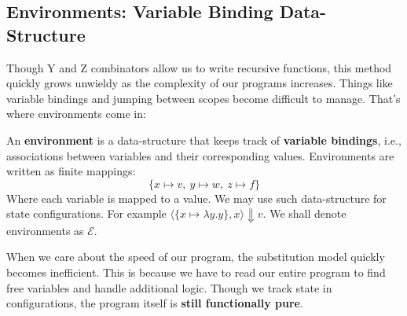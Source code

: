 \subsection{Environments: Variable Binding Data-Structure}
\noindent
Though Y and Z combinators allow us to write recursive functions, this method quickly grows unwieldy as the complexity of our programs increases.
Things like variable bindings and jumping between scopes become difficult to manage. That's where environments come in:
\begin{Def}[Environment]

    \label{def:environment}

    \noindent
    An \textbf{environment} is a data-structure that keeps track of \textbf{variable bindings}, i.e., associations between variables and their corresponding values. Environments are written as finite mappings:
    \LARGE
    \[
        \{ x \mapsto v,\ y \mapsto w,\ z \mapsto f \}
    \]
    \normalsize
    Where each variable is mapped to a value. We may use such data-structure for state configurations. For example $\langle\{x\mapsto \lambda y.y\}, x  \rangle \Downarrow v$. We shall denote environments as $\mathcal{E}$.
\end{Def}
\noindent

\begin{theo}

    When we care about the speed of our program, the substitution model quickly becomes inefficient.
    This is because we have to read our entire program to find free variables and handle additional logic.
    Though we track state in configurations, the program itself is \textbf{still functionally pure}.
\end{theo}

